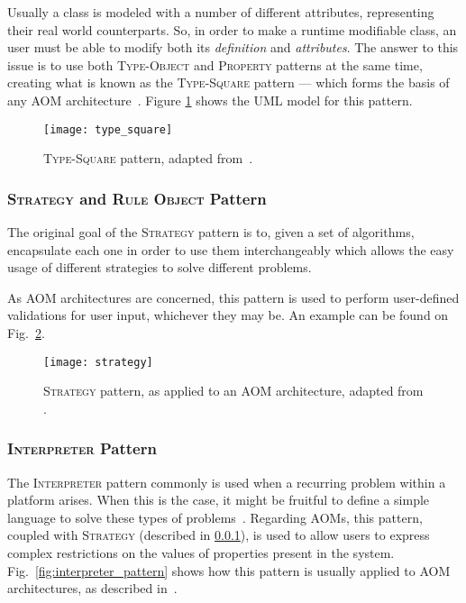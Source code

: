 Usually a class is modeled with a number of different attributes, representing their real world counterparts. So, in order to make a runtime modifiable class, an user must be able to modify both its \emph{definition} and \emph{attributes}. The answer to this issue is to use both \textsc{Type-Object} and \textsc{Property} patterns at the same time, creating what is known as the \textsc{Type-Square} pattern --- which forms the basis of any AOM architecture~\cite{YJ02}. Figure \ref{fig:type_square} shows the UML model for this pattern.

\begin{figure}[H]
  \centering
  \texttt{[image: type\_square]}
  \caption{\textsc{Type-Square} pattern, adapted from~\cite{YBJ01}.}
  \label{fig:type_square}
\end{figure}

\subsubsection{\textsc{Strategy} and \textsc{Rule Object} Pattern}\label{sec:strategy_pattern}

The original goal of the \textsc{Strategy} pattern is to, given a set of algorithms, encapsulate each one in order to use them interchangeably which allows the easy usage of different strategies to solve different problems\cite{gang_of_four}.

As AOM architectures are concerned, this pattern is used to perform user-defined validations for user input, whichever they may be. An example can be found on Fig.~\ref{fig:strategy_pattern}.

\begin{figure}[H]
  \centering
  \texttt{[image: strategy]}
  \caption{\textsc{Strategy} pattern, as applied to an AOM architecture, adapted from \cite{gang_of_four}.}
  \label{fig:strategy_pattern}
\end{figure}

\subsubsection{\textsc{Interpreter} Pattern}\label{sec:interpreter_pattern}

The \textsc{Interpreter} pattern commonly is used when a recurring problem within a platform arises. When this is the case, it might be fruitful to define a simple language to solve these types of problems~\cite{gang_of_four}. Regarding AOMs, this pattern, coupled with \textsc{Strategy} (described in \ref{sec:strategy_pattern}), is used to allow users to express complex restrictions on the values of properties present in the system. Fig.~\ref{fig:interpreter_pattern} shows how this pattern is usually applied to AOM architectures, as described in~\cite{ferreira_phd_2010}.

